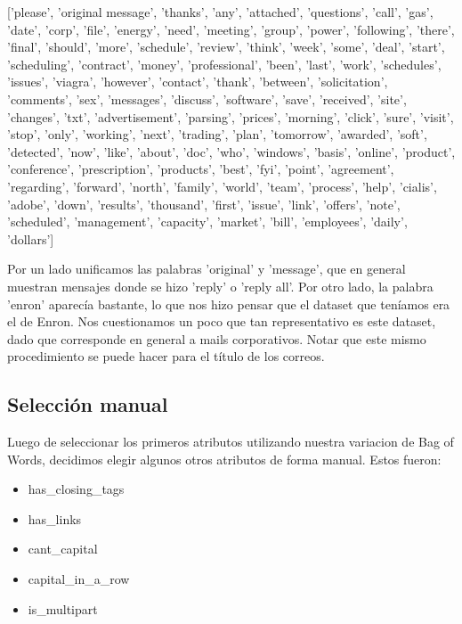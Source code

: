 \documentclass[10pt,a4paper]{article}
\begin{document}
['please', 'original message', 'thanks', 'any', 'attached', 'questions', 'call', 'gas', 'date', 'corp', 'file',
	'energy', 'need', 'meeting', 'group', 'power', 'following', 'there', 'final', 'should', 'more', 'schedule',
	'review', 'think', 'week', 'some', 'deal', 'start', 'scheduling', 'contract', 'money', 'professional', 'been',
	'last', 'work', 'schedules', 'issues', 'viagra', 'however', 'contact', 'thank', 'between', 'solicitation', 'comments',
	'sex', 'messages', 'discuss', 'software', 'save', 'received', 'site', 'changes', 'txt', 'advertisement', 'parsing', 'prices',
	'morning', 'click', 'sure', 'visit', 'stop', 'only', 'working', 'next', 'trading', 'plan', 'tomorrow',
	'awarded', 'soft', 'detected', 'now', 'like', 'about', 'doc', 'who', 'windows', 'basis', 'online', 'product', 'conference',
	'prescription', 'products', 'best', 'fyi', 'point', 'agreement', 'regarding', 'forward', 'north', 'family', 'world', 'team',
	'process', 'help', 'cialis', 'adobe', 'down', 'results', 'thousand', 'first', 'issue', 'link', 'offers', 'note',
	'scheduled', 'management', 'capacity', 'market', 'bill', 'employees', 'daily', 'dollars']

\pagebreak

Por un lado unificamos las palabras 'original' y 'message', que en general muestran mensajes donde se hizo 'reply' o 'reply all'. Por otro lado, la palabra 'enron' aparecía bastante, lo que nos hizo pensar que el dataset que teníamos era el de Enron. Nos cuestionamos un poco que tan representativo es este dataset, dado que corresponde en general a mails corporativos. Notar que este mismo procedimiento se puede hacer para el título de los correos.

\subsection{Selección manual}

Luego de seleccionar los primeros atributos utilizando nuestra variacion de Bag of Words, decidimos elegir algunos otros atributos de forma manual. Estos fueron:

\begin{itemize}
	\item has\_closing\_tags
	\item has\_links
	\item cant\_capital
	\item capital\_in\_a\_row
	\item is\_multipart
\end{itemize}
\end{document}
